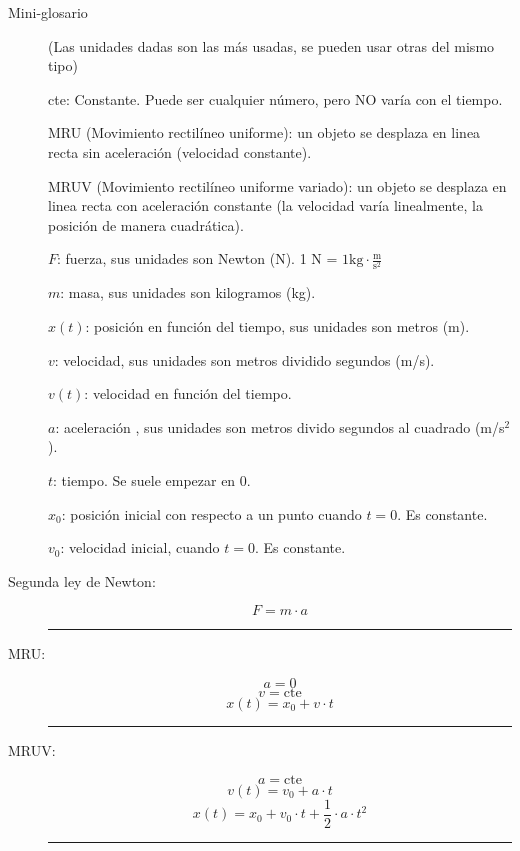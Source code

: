 \begin{description}
    \item[Mini-glosario] (Las unidades dadas son las más usadas, se pueden usar otras del mismo tipo)\hfill
    
    cte: Constante. Puede ser cualquier número, pero NO varía con el tiempo.
    
    MRU (Movimiento rectilíneo uniforme): un objeto se desplaza en linea recta sin aceleración (velocidad constante).
    
    MRUV (Movimiento rectilíneo uniforme variado): un objeto se desplaza en linea recta con aceleración constante (la velocidad varía linealmente, la posición de manera cuadrática).
    
    $F$: fuerza, sus unidades son Newton (N). 1 N = $1\text{kg}\cdot \frac{\text{m}}{\text{s}^2}$
    
    $m$: masa, sus unidades son kilogramos (kg).
    
    $x(t)$: posición en función del tiempo, sus unidades son metros (m).
    
    $v$: velocidad, sus unidades son metros dividido segundos (m/s).
    
    $v(t)$: velocidad en función del tiempo.
    
    $a$: aceleración , sus unidades son metros divido segundos al cuadrado (m/s$^2$).
    
    $t$: tiempo. Se suele empezar en 0.
    
    $x_0$: posición inicial con respecto a un punto cuando $t=0$. Es constante.
    
    $v_0$: velocidad inicial, cuando $t=0$. Es constante.
    
    \item[Segunda ley de Newton:]\hfill
    
    $$F=m\cdot a$$
    
    \hrule
    
    \item[MRU:]
    
    $$a=0$$
    $$v=\text{cte}$$
    $$x(t)= x_0 + v \cdot t$$
    
    \hrule
    
    \item[MRUV:]
    
    $$a=\text{cte}$$
    $$v(t)= v_0 + a\cdot t $$
    $$x(t)=x_0 + v_0\cdot t + \frac{1}{2}\cdot a \cdot t^2$$
    
    \hrule
    

\end{description}
